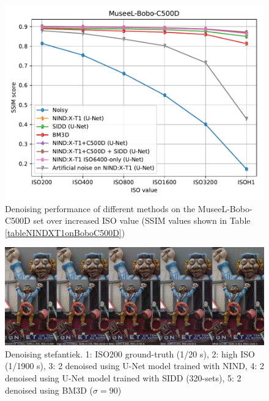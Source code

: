 \begin{figure}[!htbp]
\centering
\includegraphics[width=1\linewidth]{gfx/graphs/boboc500d.pdf}
%
\caption[Denoising performance on the MuseeL-Bobo-C500D set over increased ISO value]{Denoising performance of different methods on the MuseeL-Bobo-C500D set over increased ISO value (\acs{SSIM} values shown in Table \ref{tableNINDXT1onBoboC500D})}
\label{fig:boboc500d}
\end{figure}

\begin{figure}[!htbp]
\centering
\includegraphics[width=1\linewidth]{gfx/comp/stefantiek.jpg}
\caption[Denoising stefantiek (visual comparison)]{Denoising stefantiek. 1: ISO200 ground-truth (1/20 s), 2: high ISO (1/1900 s), 3: 2 denoised using U-Net model trained with \ac{NIND}, 4: 2 denoised using U-Net model trained with \ac{SIDD} (320-sets), 5: 2 denoised using \ac{BM3D} ($\sigma=90$)}
\label{fig:stefantiek}
\end{figure}




